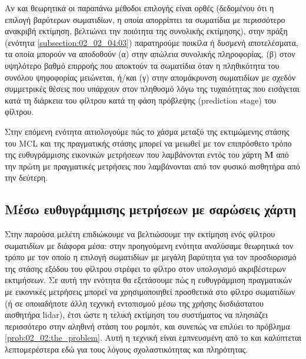 Αν και θεωρητικά οι παραπάνω μέθοδοι επιλογής είναι ορθές (δεδομένου ότι η
επιλογή βαρύτερων σωματιδίων, η οποία απορρίπτει τα σωματίδια με περισσότερο
ανακριβή εκτίμηση, βελτιώνει την ποιότητα της συνολικής εκτίμησης), στην πράξη
(ενότητα \ref{subsection:02_02_04:03}) παρατηρούμε ποικίλα ή δυσμενή
αποτελέσματα, τα οποία μπορούν να αποδοθούν (α) στην απώλεια συνολικής
πληροφορίας, (β) στον υψηλότερο βαθμό επιρροής που αποκτούν τα σωματίδια όταν η
πληθικότητα του συνόλου ψηφοφορίας μειώνεται, ή/και (γ) στην απομάκρυνση
σωματιδίων με σχεδόν συμμετρικές θέσεις που υπάρχουν στον πληθυσμό λόγω της
τυχαιότητας που εισάγεται κατά τη διάρκεια του φίλτρου κατά τη φάση πρόβλεψης
(prediction stage) του φίλτρου.

Στην επόμενη ενότητα αιτιολογούμε πώς το χάσμα μεταξύ της εκτιμώμενης στάσης
του MCL και της πραγματικής στάσης μπορεί να μειωθεί με τον επιπρόσθετο τρόπο
της ευθυγράμμισης εικονικών μετρήσεων που λαμβάνονται εντός του χάρτη $\bm{M}$
από την πρώτη με πραγματικές μετρήσεις που λαμβάνονται από τον φυσικό
αισθητήρα από την δεύτερη.

\subsection{Μέσω ευθυγράμμισης μετρήσεων με σαρώσεις χάρτη}
\label{subsection:02_02_03:02}

Στην παρούσα μελέτη επιδιώκουμε να βελτιώσουμε την εκτίμηση ενός φίλτρου
σωματιδίων με διάφορα μέσα: στην προηγούμενη ενότητα αναλύσαμε θεωρητικά τον
τρόπο με τον οποίο η επιλογή σωματιδίων με μεγάλη βαρύτητα για τον προσδιορισμό
της στάσης εξόδου του φίλτρου στρέφει το φίλτρο στον υπολογισμό ακριβέστερων
εκτιμήσεων.  Σε αυτή την ενότητα θα εξετάσουμε πώς η ευθυγράμμιση πραγματικών
με εικονικές μετρήσεις μπορεί να χρησιμοποιηθεί προσθετικά στο φίλτρο
σωματιδίων (ή σε οποιαδήποτε άλλη τεχνική εντοπισμού μέσω της χρήσης
δισδιάστατου αισθητήρα lidar), έτσι ώστε η τελική εκτίμηση του συστήματος να
πλησιάζει περισσότερο στην αληθινή στάση του ρομπότ, και συνεπώς να επιλύει
το πρόβλημα \ref{prob:02_02:the_problem}. Αυτή η τεχνική είναι εμπνευσμένη από
το \cite{Vasiljevic2016a} και καλύπτεται λεπτομερέστερα εδώ για τους λόγους
σχολαστικότητας και πληρότητας.

